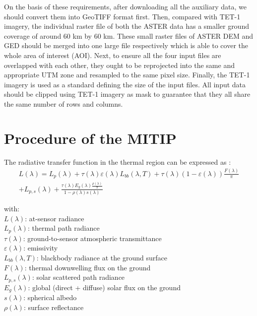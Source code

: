 \noindent On the basis of these requirements, after downloading all the auxiliary data, we should convert them into GeoTIFF format first. Then, compared with TET-1 imagery, the individual raster file of both the ASTER data has a smaller ground coverage of around 60 km by 60 km. These small raster files of ASTER DEM and GED should be merged into one large file respectively which is able to cover the whole area of interest (AOI). Next, to ensure all the four input files are overlapped with each other, they ought to be reprojected into the same and appropriate UTM zone and resampled to the same pixel size. Finally, the TET-1 imagery is used as a standard defining the size of the input files. All input data should be clipped using TET-1 imagery as mask to guarantee that they all share the same number of rows and columns.\\ 


\section{Procedure of the MITIP}

The radiative transfer function in the thermal region can be expressed as \parencite{Reference304, Reference305}:
\begin{equation}
\begin{aligned}
\label{eq301}
L(\lambda) = L_p(\lambda) + \tau (\lambda) \varepsilon (\lambda) L_{bb}(\lambda, T) + \tau (\lambda) (1 - \varepsilon (\lambda)) \frac{F(\lambda)}{\pi}\\
+L_{p,s}(\lambda) + \frac{\tau (\lambda) E_g(\lambda) \frac{\rho (\lambda)}{\pi}}{1 - \rho (\lambda) s(\lambda)}
\end{aligned}
\end{equation}

\noindent with:\\
\indent $L(\lambda)$: at-sensor radiance\\
\indent $L_p(\lambda)$: thermal path radiance\\
\indent $\tau (\lambda)$: ground-to-sensor atmospheric transmittance\\
\indent $\varepsilon (\lambda)$: emissivity\\
\indent $L_{bb}(\lambda, T)$: blackbody radiance at the ground surface\\
\indent $F(\lambda)$: thermal downwelling flux on the ground\\
\indent $L_{p, s}(\lambda)$: solar scattered path radiance\\
\indent $E_g(\lambda)$: global (direct + diffuse) solar flux on the ground\\
\indent $s(\lambda)$: spherical albedo\\
\indent $\rho (\lambda)$: surface reflectance\\

